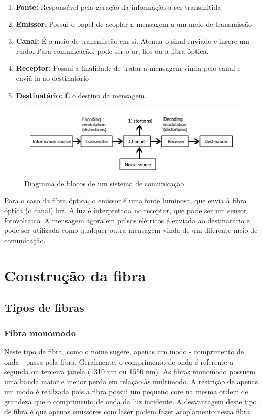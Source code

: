 \documentclass[article]{IEEEtran}
\begin{document}
\begin{enumerate}
\item \textbf{Fonte:} Responsável pela geração da informação a ser transmitida
\item \textbf{Emissor}: Possui o papel de acoplar a mensagem a um meio de transmissão
\item \textbf{Canal:} É o meio de transmissão em si. Atenua o sinal enviado e insere um ruído. Para comunicação, pode ser o ar, fios ou a fibra óptica.
\item \textbf{Receptor:} Possui a finalidade de tratar a mensagem vinda pelo canal e enviá-la ao destinatário
\item \textbf{Destinatário:} É o destino da mensagem.
\end{enumerate}

\begin{figure}[h]
\label{fig:diagrama-sistema-comunicacao}
\includegraphics[width=\columnwidth]{communication-system.jpg}
\caption{Diagrama de blocos de um sistema de comunicação}
\end{figure}

Para o caso da fibra óptica, o emissor é uma fonte luminosa, que envia à fibra óptica (o canal) luz. A luz é interpretada no receptor, que pode ser um sensor fotovoltaico. A mensagem agora em pulsos elétricos é enviada ao destinatário e pode ser utilizada como qualquer outra mensagem vinda de um diferente meio de comunicação.
\section{Construção da fibra}


\subsection{Tipos de fibras}

\subsubsection{Fibra monomodo}
Neste tipo de fibra, como o nome sugere, apenas um modo - comprimento de onda - passa pela fibra. Geralmente, o comprimento de onda é referente a segunda ou terceira janela (1310 nm ou 1550 nm). As fibras monomodo possuem uma banda maior e menor perda em relação às multimodo. A restrição de apenas um modo é realizada pois a fibra possui um pequeno core na mesma ordem de grandeza que o comprimento de onda da luz incidente. A desvantagem deste tipo de fibra é que apenas emissores com laser podem fazer acoplamento nesta fibra.
\end{document}
